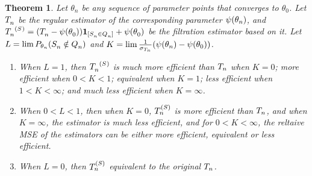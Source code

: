 \documentclass[ejs, twoside]{imsart}
\theoremstyle{plain}
\newtheorem{theorem}{Theorem}[section]
\newtheorem{proposition}[theorem]{Proposition}
\theoremstyle{remark}
\newtheorem{example}[theorem]{Example}
\newtheorem{assumption}[theorem]{Assumption}
\newcommand{\andtext}{\ \mathrm{and}\ }
\newcommand{\filter}{*}
\numberwithin{equation}{section}
\numberwithin{table}{section}
\numberwithin{figure}{section}
\let\originalleft\left
\let\originalright\right
\renewcommand{\left}{\mathopen{}\mathclose\bgroup\originalleft}
\renewcommand{\right}{\aftergroup\egroup\originalright}
\begin{document}


	
	
	
	\begin{theorem} \label{thm:effclass}
		Let \(\theta_n\) be any sequence of parameter points that converges to \(\theta_0\). Let \(\basestat[][n]\) be the regular estimator of the corresponding parameter \(\psi\left(\theta_n\right)\), and \(\shrinkestim[][n] = \shrinkestimdef[][n] \) be the filtration estimator based on it.
		Let \(L = \lim P_{\theta_n} \left( \filevent[][n] \right) \) and \(K = \lim \frac{1}{\sigma_{T_n}} \left( \psi\left(\theta_n\right) - \psi\left(\theta_0\right) \right)\). %
		\begin{enumerate}[label = \roman*.]
			\item When \(L = 1\), then \(\shrinkestim[][n]\) is much more efficient than \(\estimreg\) when \(K = 0\); more efficient when \(0 < K < 1\); equivalent when \(K = 1\); less efficient when \(1<K<\infty\); and much less efficient when \(K = \infty\).
			\item When \(0 < L < 1\), then when \(K = 0\), \(\estimfil\) is more efficient than \(\estimreg\), and when \(K = \infty\), the estimator is much less efficient, and for \(0<K<\infty\), the reltaive MSE of the estimators can be either more efficient, equivalent or less efficient.
			\item When \(L = 0\), then \(\estimfil\) equivalent to the original \(\estimreg\).
			
		\end{enumerate}
	\end{theorem}
	



\end{document}
